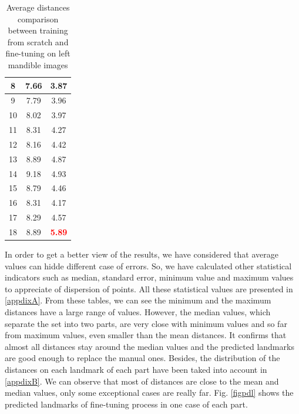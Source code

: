 \documentclass[review]{elsarticle}
\begin{document}
\begin{table}
\begin{minipage}[t]{0.45\textwidth}
\begin{tabular}{|c|c|c|}
	8 & 7.66 & 3.87  \\ \hline
	9 & 7.79 & 3.96 \\ \hline
	10 & 8.02 & 3.97 \\ \hline
	11 & 8.31 & 4.27 \\ \hline
	12 & 8.16 & 4.42 \\ \hline
	13 & 8.89 & 4.87 \\ \hline
	14 & 9.18 & 4.93 \\ \hline
	15 & 8.79 & 4.46 \\ \hline
	16 & 8.31 & 4.17 \\ \hline
	17 & 8.29 & 4.57 \\ \hline
	18 & 8.89 & \textcolor{red}{\textbf{5.89}} \\ \hline
		\end{tabular}
		\caption{Average distances comparison between training from scratch and fine-tuning on left mandible images}
		\label{cmpmd}
	\end{minipage}
\end{table}
In order to get a better view of the results, we have considered that average values can hidde different case of errors. So, we have calculated other statistical indicators such as median, standard error, minimum value and maximum values to appreciate of dispersion of points. All these statistical values are presented in \ref{appdixA}. From these tables, we can see the minimum and the maximum distances have a large range of values. However, the median values, which separate the set into two parts, are very close with minimum values and so far from maximum values, even smaller than the mean distances. It confirms that almost all distances stay around the median values and the predicted landmarks are good enough to replace the manual ones. Besides, the distribution of the distances on each landmark of each part have been taked into account in \ref{appdixB}. We can observe that most of distances are close to the mean and median values, only some exceptional cases are really far. Fig. \ref{figpdl} shows the predicted landmarks of fine-tuning process in one case of each part.
\end{document}
